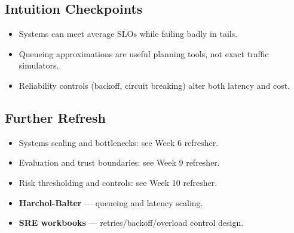 \subsection*{Intuition Checkpoints}
\begin{itemize}[leftmargin=1.5em]
  \item Systems can meet average SLOs while failing badly in tails.
  \item Queueing approximations are useful planning tools, not exact traffic simulators.
  \item Reliability controls (backoff, circuit breaking) alter both latency and cost.
\end{itemize}

\subsection*{Further Refresh}
\begin{itemize}[leftmargin=1.5em]
  \item Systems scaling and bottlenecks: see Week 6 refresher.
  \item Evaluation and trust boundaries: see Week 9 refresher.
  \item Risk thresholding and controls: see Week 10 refresher.
  \item \textbf{Harchol-Balter} --- queueing and latency scaling.
  \item \textbf{SRE workbooks} --- retries/backoff/overload control design.
\end{itemize}
